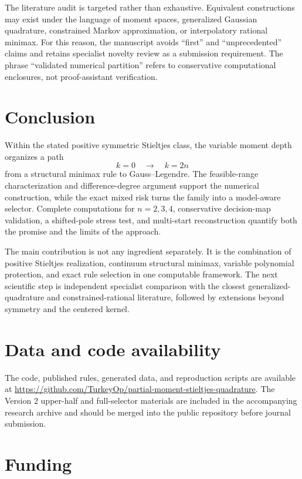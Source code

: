 \documentclass[preprint,12pt]{elsarticle}
\theoremstyle{remark}
\begin{document}
The literature audit is targeted rather than exhaustive. Equivalent
constructions may exist under the language of moment spaces,
generalized Gaussian quadrature, constrained Markov approximation, or
interpolatory rational minimax. For this reason, the manuscript avoids
``first'' and ``unprecedented'' claims and retains specialist novelty
review as a submission requirement. The phrase ``validated numerical
partition'' refers to conservative computational enclosures, not
proof-assistant verification.

\section{Conclusion}

Within the stated positive symmetric Stieltjes class, the variable
moment depth organizes a path
\[
k=0
\quad\longrightarrow\quad
k=2n
\]
from a structural minimax rule to Gauss--Legendre. The
feasible-range characterization and difference-degree argument support
the numerical construction, while the exact mixed risk turns the family
into a model-aware selector. Complete computations for \(n=2,3,4\),
conservative decision-map validation, a shifted-pole stress test, and
multi-start reconstruction quantify both the promise and the limits of
the approach.

The main contribution is not any ingredient separately. It is the
combination of positive Stieltjes realization, continuum structural
minimax, variable polynomial protection, and exact rule selection in one
computable framework. The next scientific step is independent
specialist comparison with the closest generalized-quadrature and
constrained-rational literature, followed by extensions beyond symmetry
and the centered kernel.

\section*{Data and code availability}

The code, published rules, generated data, and reproduction scripts are
available at
\url{https://github.com/TurkeyOp/partial-moment-stieltjes-quadrature}.
The Version 2 upper-half and full-selector materials are included in the
accompanying research archive and should be merged into the public
repository before journal submission.

\section*{Funding}
\end{document}
